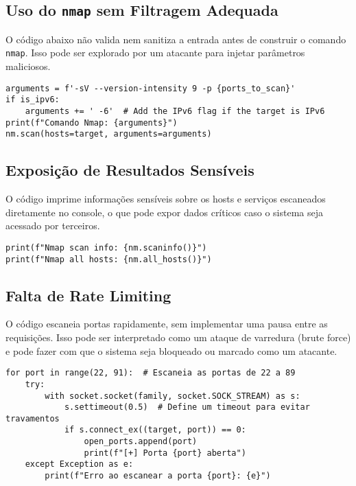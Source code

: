 \documentclass[12pt]{article}
\begin{document}
\subsection{Uso do \texttt{nmap} sem Filtragem Adequada}

O código abaixo não valida nem sanitiza a entrada antes de construir o comando \texttt{nmap}. Isso pode ser explorado por um atacante para injetar parâmetros maliciosos.

\begin{lstlisting}
arguments = f'-sV --version-intensity 9 -p {ports_to_scan}'
if is_ipv6:
    arguments += ' -6'  # Add the IPv6 flag if the target is IPv6
print(f"Comando Nmap: {arguments}")
nm.scan(hosts=target, arguments=arguments)
\end{lstlisting}

\subsection{Exposição de Resultados Sensíveis}

O código imprime informações sensíveis sobre os hosts e serviços escaneados diretamente no console, o que pode expor dados críticos caso o sistema seja acessado por terceiros.

\begin{lstlisting}
print(f"Nmap scan info: {nm.scaninfo()}")
print(f"Nmap all hosts: {nm.all_hosts()}")
\end{lstlisting}

\subsection{Falta de Rate Limiting}

O código escaneia portas rapidamente, sem implementar uma pausa entre as requisições. Isso pode ser interpretado como um ataque de varredura (brute force) e pode fazer com que o sistema seja bloqueado ou marcado como um atacante.

\begin{lstlisting}
for port in range(22, 91):  # Escaneia as portas de 22 a 89
    try:
        with socket.socket(family, socket.SOCK_STREAM) as s:
            s.settimeout(0.5)  # Define um timeout para evitar travamentos
            if s.connect_ex((target, port)) == 0:
                open_ports.append(port)
                print(f"[+] Porta {port} aberta")
    except Exception as e:
        print(f"Erro ao escanear a porta {port}: {e}")
\end{lstlisting}
\end{document}
